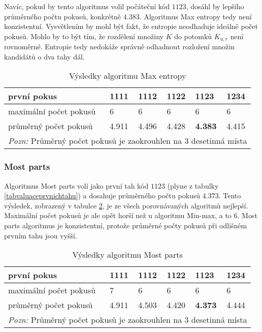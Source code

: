 Navíc, pokud by tento algoritmus volil počáteční kód $1123$, dosáhl by lepšího průměrného počtu pokusů, konkrétně $4.383$. Algoritmus Max entropy tedy není konzistentní. Vysvětlením by mohl být fakt, že entropie neodhaduje ideálně počet pokusů. Mohlo by to být tím, že rozdělení množiny $K$ do potomků $K_{u,r}$ není rovnoměrné. Entropie tedy nedokáže správně odhadnout rozložení množin kandidátů o dva tahy dál. 
\begin{table}[h]
\centering
\begin{tabular}{l l l l l l}
\toprule
první pokus & 1111 & 1112 & 1122 & 1123 & \textbf{1234} \\
\midrule

maximální počet pokusů 
& 6 & 6 & 6 & 6 & 6 \\

průměrný počet pokusů 
& 4.911 & 4.496 & 4.428 & \textbf{4.383} & 4.415 \\
\bottomrule
\multicolumn{6}{l}{\footnotesize \textit{Pozn:}
Průměrný počet pokusů je zaokrouhlen na $3$ desetinná místa}
\end{tabular}
\caption{Výsledky algoritmu Max entropy}\label{tabentropievysl}
\end{table}



\subsubsection{Most parts}
Algoritmus Most parts volí jako první tah kód $1123$ (plyne z tabulky \ref{tabvaluaceprvnichtahu}) a dosahuje průměrného počtu pokusů $4.373$. Tento výsledek, zobrazený v tabulce \ref{tabcastivysl}, je ze všech porovnávaných algoritmů nejlepší. Maximální počet pokusů je ale opět horší než u algoritmu Min-max, a to 6. Most parts algoritmus je konzistentní, protože průměrné počty pokusů při odlišném prvním tahu jsou vyšší.


\begin{table}[h]
\centering
\begin{tabular}{l l l l l l}
\toprule
první pokus & 1111 & 1112 & 1122 & \textbf{1123} & 1234 \\
\midrule

maximální počet pokusů 
& 7 & 6 & 6 & 6 & 6 \\

průměrný počet pokusů 
& 4.911 & 4.503 & 4.420 & \textbf{4.373} & 4.444\\
\bottomrule
\multicolumn{6}{l}{\footnotesize \textit{Pozn:}
Průměrný počet pokusů je zaokrouhlen na $3$ desetinná místa}
\end{tabular}
\caption{Výsledky algoritmu Most parts}\label{tabcastivysl}
\end{table}


